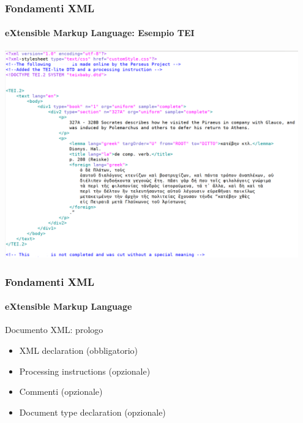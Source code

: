 \begin{frame}
	\frametitle{Fondamenti XML}
	\framesubtitle{eXtensible Markup Language: Esempio TEI}
	\addtocounter{nframe}{1}

	\begin{center}
		\includegraphics[width=0.95\textwidth]{imgs/xml-TEI-PerseusExample.png}
	\end{center}

\end{frame}


\begin{frame}
	\frametitle{Fondamenti XML}
	\framesubtitle{eXtensible Markup Language}
	\addtocounter{nframe}{1}

	\begin{block}{Documento XML: prologo}
		\begin{itemize}
			\item XML declaration (obbligatorio)
			\item Processing instructions (opzionale)
			\item Commenti (opzionale)
			\item Document type declaration (opzionale)
		\end{itemize}
        
	\end{block}

\end{frame}

